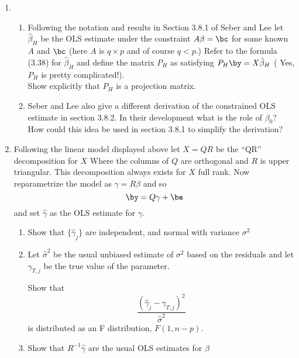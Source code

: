 \documentclass[10pt]{report}
\begin{document}
\begin{enumerate} 
\item 
\begin{enumerate}
 \item  Following the notation and results in Section 3.8.1 of Seber and Lee let $\hat{\beta}_H$ be the OLS estimate under the constraint $A\beta =\bc$ for some known $A$ and $\bc$  (here $A$ is $q \times p$  and of course $q < p$.) 
 Refer to the formula  (3.38) for $\hat{\beta}_H$  and  define the matrix $P_H$ as  satisfying $ P_H \by = X \hat{\beta}_H$ ( Yes, $P_H$ is pretty complicated!).   
  \\
 Show explicitly that  $P_H$ is a projection matrix. 
 \item Seber and Lee also give a different derivation of the constrained OLS estimate in section 3.8.2. In their development what is the role of $\beta_0$?  How could this idea be used in section 3.8.1 to simplify the derivation? 
 \end{enumerate}
 

\item  Following the linear model  displayed above  let $ X= QR$ be the  ``QR'' decomposition for $X$ Where the columns of $Q$ are orthogonal and $R$ is upper triangular.  This decomposition always exists for $X$ full rank. Now reparametrize the model as $\gamma= R \beta$ and so  
\[  \by = Q \gamma + \be \]
 and set  $ \hat{\gamma}$ as  the OLS estimate for $\gamma$. 
 \begin{enumerate}
 \item  Show that  $\{ \hat{\gamma}_j \}$ are independent, and normal with variance $\sigma^2$
 \item  Let $\hat{\sigma}^2$ be the usual  unbiased estimate of $\sigma^2$ based on the residuals 
 and let $\gamma_{T,j} $ be the true value of the parameter.
 
 Show that  
 \[ \frac{ (\hat{\gamma}_j - \gamma_{T,j })^2}{\hat{\sigma}^2} \]
 is distributed as an F distribution, $F(1,n-p)$. 
 
\item Show that $ R^{-1} \hat{\gamma} $ are the  usual OLS estimates for $\beta$

\end{enumerate}

 



\end{enumerate}
\end{document}
